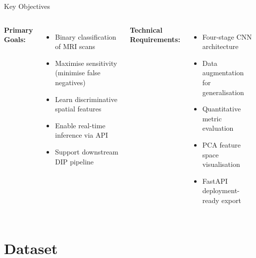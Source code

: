 \documentclass[aspectratio=169,11pt]{beamer}
\begin{document}
\begin{frame}{Key Objectives}
    \begin{columns}[T]
        \textbf{Primary Goals:}
        \begin{itemize}\setlength\itemsep{3pt}
            \item Binary classification of MRI scans
            \item Maximise sensitivity (minimise false negatives)
            \item Learn discriminative spatial features
            \item Enable real-time inference via API
            \item Support downstream DIP pipeline
        \end{itemize}
        \textbf{Technical Requirements:}
        \begin{itemize}\setlength\itemsep{3pt}
            \item Four-stage CNN architecture
            \item Data augmentation for generalisation
            \item Quantitative metric evaluation
            \item PCA feature space visualisation
            \item FastAPI deployment-ready export
        \end{itemize}
    \end{columns}
    \vspace{0.45cm}
    \centering
\end{frame}

\section{Dataset}
\end{document}
